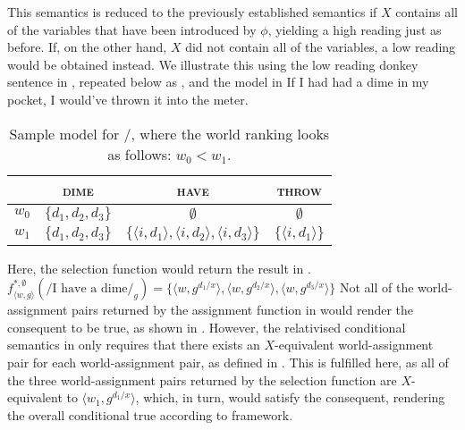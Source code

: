This semantics is reduced to the previously established semantics if $X$ contains all of the variables that have been introduced by $\phi$, yielding a high reading just as before. If, on the other hand, $X$ did not contain all of the variables, a low reading would be obtained instead. We illustrate this using the low reading donkey sentence in , repeated below as , and the model in  \parencite[due][]{Walker2015}
\ex
If I had had a dime in my pocket, I would've thrown it into the meter.\\\emptyfill\parencites[adapted from][]{Schubert1987}[p.~395]{vanRooij2006}
\xe
\begin{table}[!htb]
\caption{Sample model for /, where the world ranking looks as follows: $w_0<w_1$.}
    \begin{tabular}{lccc}\toprule
            & {\scshape dime} & {\scshape have} & {\scshape throw}\\\midrule
            $w_0$ & $\{d_1,d_2,d_3\}$ & $\emptyset$ & $\emptyset$\\
            $w_1$ & $\{d_1,d_2,d_3\}$ & $\{\langle i,d_1\rangle,\langle i,d_2\rangle,\langle i,d_3\rangle\}$ & $\{\langle i,d_1\rangle\}$\\
          \bottomrule
    \end{tabular}
\end{table}

\noindent Here, the selection function would return the result in .
\ex
$f^{*,\emptyset}_{\langle w,g\rangle}(/\text{I have a dime}/_g)=\{\langle w,g^{d_1/x}\rangle,\langle w,g^{d_2/x}\rangle,\langle w,g^{d_3/x}\rangle\}$
\xe
Not all of the world-assignment pairs returned by the assignment function in  would render the consequent to be true, as shown in . However, the relativised conditional semantics in  only requires that there exists an $X$-equivalent world-assignment pair for each world-assignment pair, as defined in . This is fulfilled here, as all of the three world-assignment pairs returned by the selection function are $X$-equivalent to $\langle w_1,g^{d_1/x}\rangle$, which, in turn, would satisfy the consequent, rendering the overall conditional true according to  framework.

